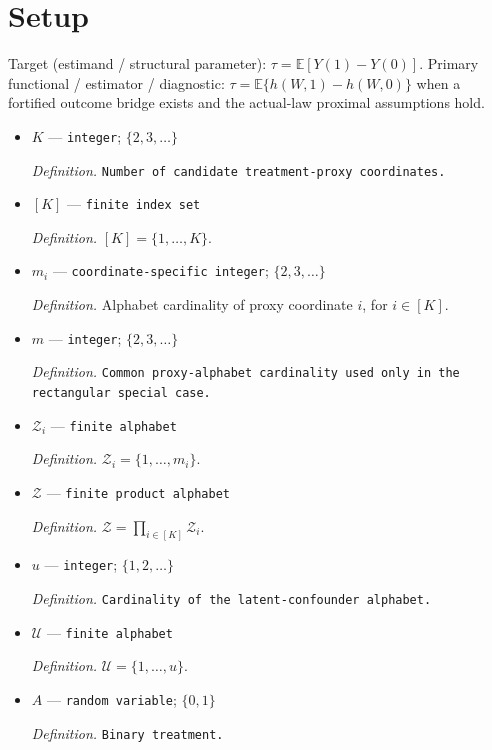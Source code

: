 \documentclass{article}
\begin{document}
\section{Setup}

Target (estimand / structural parameter): \(\tau=\mathbb E[Y(1)-Y(0)]\).
Primary functional / estimator / diagnostic: \(\tau=\mathbb E\{h(W,1)-h(W,0)\}\) when a fortified outcome bridge exists and the actual-law proximal assumptions hold.
\begin{itemize}
  \item \(K\) --- \texttt{integer}; \(\{2,3,\ldots\}\)
  \par\smallskip\noindent\emph{Definition.} \texttt{Number of candidate treatment-\allowbreak{}proxy coordinates.}
  \item \([K]\) --- \texttt{finite index set}
  \par\smallskip\noindent\emph{Definition.} \([K]=\{1,\ldots,K\}\).
  \item \(m_i\) --- \texttt{coordinate-\allowbreak{}specific integer}; \(\{2,3,\ldots\}\)
  \par\smallskip\noindent\emph{Definition.} Alphabet cardinality of proxy coordinate \(i\), for \(i\in[K]\).
  \item \(m\) --- \texttt{integer}; \(\{2,3,\ldots\}\)
  \par\smallskip\noindent\emph{Definition.} \texttt{Common proxy-\allowbreak{}alphabet cardinality used only in the rectangular special case.}
  \item \(\mathcal Z_i\) --- \texttt{finite alphabet}
  \par\smallskip\noindent\emph{Definition.} \(\mathcal Z_i=\{1,\ldots,m_i\}\).
  \item \(\mathcal Z\) --- \texttt{finite product alphabet}
  \par\smallskip\noindent\emph{Definition.} \(\mathcal Z=\prod_{i\in[K]}\mathcal Z_i\).
  \item \(u\) --- \texttt{integer}; \(\{1,2,\ldots\}\)
  \par\smallskip\noindent\emph{Definition.} \texttt{Cardinality of the latent-\allowbreak{}confounder alphabet.}
  \item \(\mathcal U\) --- \texttt{finite alphabet}
  \par\smallskip\noindent\emph{Definition.} \(\mathcal U=\{1,\ldots,u\}\).
  \item \(A\) --- \texttt{random variable}; \(\{0,1\}\)
  \par\smallskip\noindent\emph{Definition.} \texttt{Binary treatment.}

\end{itemize}
\end{document}
